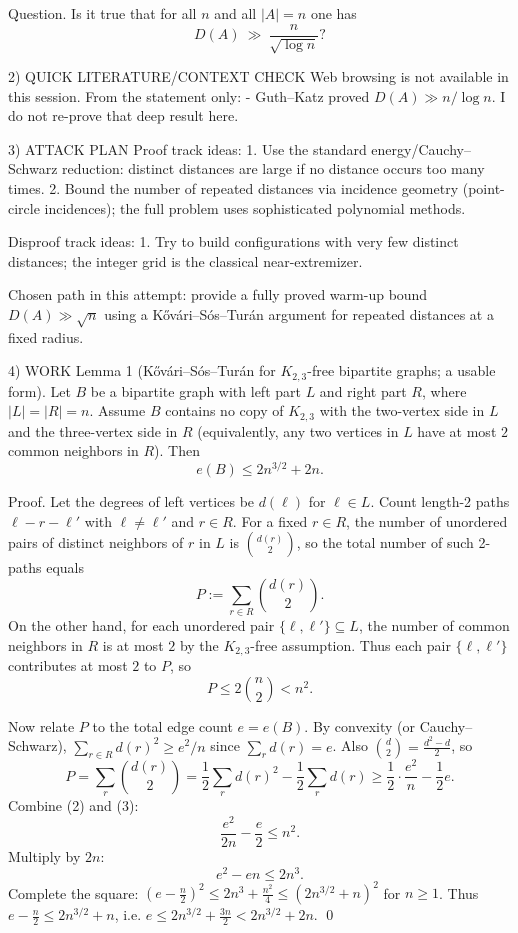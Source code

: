 Question.
Is it true that for all $n$ and all $|A|=n$ one has
\[D(A)\ \gg\ \frac{n}{\sqrt{\log n}}?\]

2) QUICK LITERATURE/CONTEXT CHECK
Web browsing is not available in this session.
From the statement only:
- Guth--Katz proved $D(A)\gg n/\log n$.
I do not re-prove that deep result here.

3) ATTACK PLAN
Proof track ideas:
1. Use the standard energy/Cauchy--Schwarz reduction: distinct distances are large if no distance occurs too many times.
2. Bound the number of repeated distances via incidence geometry (point-circle incidences); the full problem uses sophisticated polynomial methods.

Disproof track ideas:
1. Try to build configurations with very few distinct distances; the integer grid is the classical near-extremizer.

Chosen path in this attempt: provide a fully proved warm-up bound $D(A)\gg \sqrt n$ using a K\H{o}v\'ari--S\'os--Tur\'an argument for repeated distances at a fixed radius.

4) WORK
Lemma 1 (K\H{o}v\'ari--S\'os--Tur\'an for $K_{2,3}$-free bipartite graphs; a usable form).
Let $B$ be a bipartite graph with left part $L$ and right part $R$, where $|L|=|R|=n$.
Assume $B$ contains no copy of $K_{2,3}$ with the two-vertex side in $L$ and the three-vertex side in $R$ (equivalently, any two vertices in $L$ have at most $2$ common neighbors in $R$).
Then
\[e(B)\le 2n^{3/2}+2n.\]

Proof.
Let the degrees of left vertices be $d(\ell)$ for $\ell\in L$.
Count length-2 paths $\ell-r-\ell'$ with $\ell\ne \ell'$ and $r\in R$.
For a fixed $r\in R$, the number of unordered pairs of distinct neighbors of $r$ in $L$ is $\binom{d(r)}{2}$, so the total number of such 2-paths equals
\[P:=\sum_{r\in R}\binom{d(r)}{2}.\tag{1}\]
On the other hand, for each unordered pair $\{\ell,\ell'\}\subseteq L$, the number of common neighbors in $R$ is at most $2$ by the $K_{2,3}$-free assumption.
Thus each pair $\{\ell,\ell'\}$ contributes at most $2$ to $P$, so
\[P\le 2\binom{n}{2} < n^2.\tag{2}\]

Now relate $P$ to the total edge count $e=e(B)$.
By convexity (or Cauchy--Schwarz), $\sum_{r\in R} d(r)^2 \ge e^2/n$ since $\sum_{r} d(r)=e$.
Also $\binom{d}{2}=\frac{d^2-d}{2}$, so
\[P=\sum_{r}\binom{d(r)}{2}=\frac12\sum_r d(r)^2 - \frac12\sum_r d(r)\ge \frac12\cdot \frac{e^2}{n}-\frac12 e.\tag{3}\]
Combine (2) and (3):
\[\frac{e^2}{2n}-\frac{e}{2} \le n^2.\]
Multiply by $2n$:
\[e^2 - en \le 2n^3.\]
Complete the square: $(e-\tfrac{n}{2})^2 \le 2n^3 + \tfrac{n^2}{4} \le (2n^{3/2}+n)^2$ for $n\ge 1$.
Thus $e-\tfrac{n}{2}\le 2n^{3/2}+n$, i.e. $e\le 2n^{3/2}+\tfrac{3n}{2}<2n^{3/2}+2n$.
\qed

